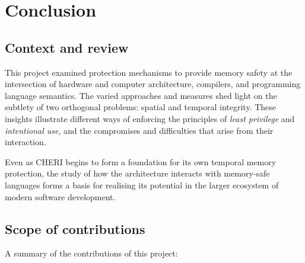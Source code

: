 \documentclass[dissertation.tex]{subfiles}
\begin{document}
\chapter{Conclusion}

\section{Context and review}

This project examined protection mechanisms to provide memory safety at
the intersection of hardware and computer architecture, compilers, and
programming language semantics.
The varied approaches and measures shed light on the subtlety of
two orthogonal problems: spatial and temporal integrity.
These insights illustrate different ways of enforcing the principles of
\emph{least privilege} and \emph{intentional use}, and the compromises
and difficulties that arise from their interaction.


Even as CHERI begins to form a foundation for its own temporal memory
protection, the study of how the architecture interacts with memory-safe
languages forms a basis for realising its potential in the larger
ecosystem of modern software development.


\section{Scope of contributions}

A summary of the contributions of this project:
\end{document}
